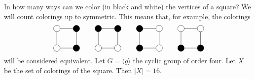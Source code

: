 \begin{example}
    In how many ways can we color (in black and white) the vertices of a square? 
    We will count colorings up to symmetric. This means that, for example, 
    the colorings 
    \begin{equation}
    \label{eq:orbita}
    \begin{tikzpicture}
        \node[shape=circle,draw=black,fill=black] (A) at (1,0){};
        \node[shape=circle,draw=black,fill=black] (B) at (1,1){};
        \node[shape=circle,draw=black] (C) at (0,1){}; 
        \node[shape=circle,draw=black] (D) at (0,0){};
        \path [-](A) edge node[left]{} (B);
        \path [-](B) edge node[left]{} (C);
        \path [-](C) edge node[left]{} (D);
        \path [-](D) edge node[left]{} (A);
    \end{tikzpicture}
    \qquad
    \begin{tikzpicture}
        \node[shape=circle,draw=black] (A) at (1,0) {};
        \node[shape=circle,draw=black,fill=black] (B) at (1,1) {};
        \node[shape=circle,draw=black,fill=black] (C) at (0,1) {};
        \node[shape=circle,draw=black] (D) at (0,0) {};
        \path [-](A) edge node[left]{} (B);
        \path [-](B) edge node[left]{} (C);
        \path [-](C) edge node[left]{} (D);
        \path [-](D) edge node[left]{} (A);
    \end{tikzpicture}
    \qquad
    \begin{tikzpicture}
        \node[shape=circle,draw=black] (A) at (1,0) {};
        \node[shape=circle,draw=black] (B) at (1,1) {};
        \node[shape=circle,draw=black,fill=black] (C) at (0,1) {};
        \node[shape=circle,draw=black,fill=black] (D) at (0,0) {};
        \path [-](A) edge node[left]{} (B);
        \path [-](B) edge node[left]{} (C);
        \path [-](C) edge node[left]{} (D);
        \path [-](D) edge node[left]{} (A);
    \end{tikzpicture}
    \qquad
    \begin{tikzpicture}
        \node[shape=circle,draw=black,fill=black] (A) at (1,0) {};
        \node[shape=circle,draw=black] (B) at (1,1) {};
        \node[shape=circle,draw=black] (C) at (0,1) {};
        \node[shape=circle,draw=black,fill=black] (D) at (0,0) {};
        \path [-](A) edge node[left]{} (B);
        \path [-](B) edge node[left]{} (C);
        \path [-](C) edge node[left]{} (D);
        \path [-](D) edge node[left]{} (A);
    \end{tikzpicture}
\end{equation}
will be considered equivalent. Let $G=\langle g\rangle$ the cyclic 
group of order four. Let $X$ be 
the set of colorings of the square. Then 
$|X|=16$. 


\end{example}
